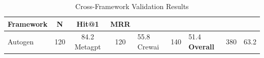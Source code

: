 
\begin{table}[t]
\caption{Cross-Framework Validation Results}
\label{tab:real_validation}
\centering
\begin{tabular}{lccc}
\toprule
\textbf{Framework} & \textbf{N} & \textbf{Hit@1} & \textbf{MRR} \\
\midrule
Autogen & 120 & 84.2%
Metagpt & 120 & 55.8%
Crewai & 140 & 51.4%
\midrule
\textbf{Overall} & 380 & 63.2%
\bottomrule
\end{tabular}
\end{table}
